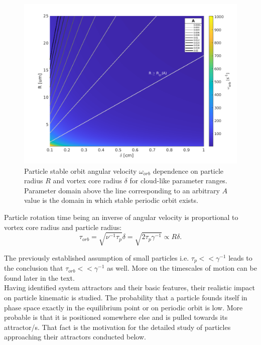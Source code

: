 \documentclass[../main.tex]{subfiles}
\begin{document}
\begin{figure}
\centering
\noindent \includegraphics[width=30pc]{gfx/orbit_vel_vs_R_and_delta.png}
\caption{Particle stable orbit angular velocity $\omega_{orb}$ dependence on particle radius $R$ and vortex core radius $\delta$ for cloud-like parameter ranges. Parameter domain above the line corresponding to an arbitrary $A$ value is the domain in which stable periodic orbit exists.}
\label{fig:ch3_3b}
\end{figure}

Particle rotation time being an inverse of angular velocity is proportional to vortex core radius and particle radius:
\begin{equation}
\tau_{orb}=\sqrt{\nu^{-1} \tau_p}\delta=\sqrt{2 \tau_p \gamma^{-1}} \propto R \delta.
\label{ch3:eq21}
\end{equation}

The previously established assumption of small particles  i.e. $\tau_p<<\gamma^{-1}$ leads to the conclusion that $\tau_{orb}<<\gamma^{-1}$ as well. More on the timescales of motion can be found later in the text.\\
Having identified system attractors and their basic features, their realistic impact on particle kinematic is studied. The probability that a particle founds itself in phase space exactly in the equilibrium point or on periodic orbit is low. More probable is that it is positioned somewhere else and is pulled towards its attractor/s. That fact is the motivation for the detailed study of particles approaching their attractors conducted below.\\
\end{document}
